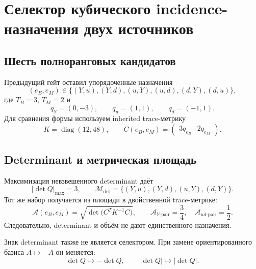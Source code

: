 \chapter{Селектор кубического incidence-назначения двух источников}
\label{ch:v8-extra-mass-cubic-incidence-selector}

\section{Шесть полноранговых кандидатов}

Предыдущий гейт оставил упорядоченные назначения
\begin{equation}
 (e_B,e_M)\in
 \{(Y,u),(Y,d),(u,Y),(u,d),(d,Y),(d,u)\},
 \label{eq:v8-cubic-incidence-selector-menu}
\end{equation}
где $T_B=3$, $T_M=2$ и
\begin{equation}
 q_Y=(0,-3),\qquad q_u=(1,1),\qquad q_d=(-1,1).
 \label{eq:v8-cubic-incidence-selector-charges}
\end{equation}
Для сравнения формы используем inherited trace-метрику
\begin{equation}
 K=\operatorname{diag}(12,48),
 \qquad
 C(e_B,e_M)=\begin{pmatrix}3q_{e_B}&2q_{e_M}\end{pmatrix}.
 \label{eq:v8-cubic-incidence-selector-weighted-map}
\end{equation}

\section{Determinant и метрическая площадь}

Максимизация невзвешенного determinant даёт
\begin{equation}
 |\det Q|_{\max}=3,
 \qquad
 \mathcal M_{\det}=\{(Y,u),(Y,d),(u,Y),(d,Y)\}.
 \label{eq:v8-cubic-incidence-selector-det-survivors}
\end{equation}
Тот же набор получается из площади в двойственной trace-метрике:
\begin{equation}
 \mathcal A(e_B,e_M)=
 \sqrt{\det\bigl(C^TK^{-1}C\bigr)},
 \qquad
 \mathcal A_{Y\text{-pair}}=\frac34,
 \quad \mathcal A_{ud\text{-pair}}=\frac12.
 \label{eq:v8-cubic-incidence-selector-metric-area}
\end{equation}
Следовательно, determinant и объём не дают единственного назначения.

Знак determinant также не является селектором. При замене ориентированного
базиса $A\mapsto-A$ он меняется:
\begin{equation}
 \det Q\longmapsto-\det Q,
 \qquad |\det Q|\longmapsto|\det Q|.
 \label{eq:v8-cubic-incidence-selector-orientation-sign}
\end{equation}

